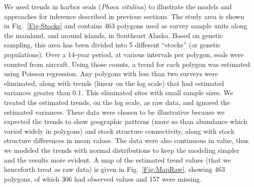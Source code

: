 \documentclass[11pt, titlepage]{article}\usepackage[]{graphicx}\usepackage[]{color}
\begin{document}
\begin{spacing}{1.9}
\begin{flushleft}



























We used trends in harbor seals (\emph{Phoca vitulina}) to illustrate the models and approaches for inference described in previous sections. The study area is shown in Fig.~\ref{Fig-Stocks} and contains 463 polygons used as survey sample units along the mainland, and around islands, in Southeast Alaska.  Based on genetic sampling, this area has been divided into 5 different ``stocks'' (or genetic populations). Over a 14-year period, at various intervals per polygon, seals were counted from aircraft.  Using those counts, a trend for each polygon was estimated using Poisson regression.  Any polygons with less than two surveys were eliminated, along with trends (linear on the log scale) that had estimated variances greater than 0.1.  This eliminated sites with small sample sizes.  We treated the estimated trends, on the log scale, as raw data, and ignored the estimated variances.  These data were chosen to be illustrative because we expected the trends to show geographic patterns (more so than abundance which varied widely in polygons) and stock structure connectivity, along with stock structure differences in mean values. The data were also continuous in value, thus we modeled the trends with normal distributions to keep the modeling simpler and the results more evident.  A map of the estimated trend values (that we henceforth treat as raw data) is given in Fig.~\ref{Fig-MapRaw}, showing 463 polygons, of which 306 had observed values and 157 were missing.


\end{flushleft}
\end{spacing}
\end{document}
